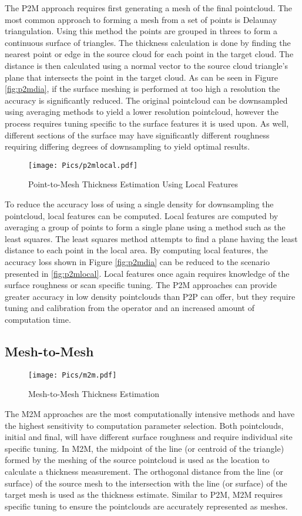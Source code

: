 The P2M approach requires first generating a mesh of the final pointcloud. The most common approach to forming a mesh from a set of points is Delaunay triangulation. Using this method the points are grouped in threes to form a continuous surface of triangles. The thickness calculation is done by finding the nearest point or edge in the source cloud for each point in the target cloud. The distance is then calculated using a normal vector to the source cloud triangle's plane that intersects the point in the target cloud. As can be seen in Figure \ref{fig:p2mdia}, if the surface meshing is performed at too high a resolution the accuracy is significantly reduced. The original pointcloud can be downsampled using averaging methods to yield a lower resolution pointcloud, however the process requires tuning specific to the surface features it is used upon. As well, different sections of the surface may have significantly different roughness requiring differing degrees of downsampling to yield optimal results.\\
\begin{figure}[h!]
    \centering
    \texttt{[image: Pics/p2mlocal.pdf]}
    \caption{Point-to-Mesh Thickness Estimation Using Local Features}
    \label{fig:p2mlocaldia}
\end{figure}
To reduce the accuracy loss of using a single density for downsampling the pointcloud, local features can be computed. Local features are computed by averaging a group of points to form a single plane using a method such as the least squares. The least squares method attempts to find a plane having the least distance to each point in the local area. By computing local features, the accuracy loss shown in Figure \ref{fig:p2mdia} can be reduced to the scenario presented in \ref{fig:p2mlocal}. Local features once again requires knowledge of the surface roughness or scan specific tuning. The P2M approaches can provide greater accuracy in low density pointclouds than P2P can offer, but they require tuning and calibration from the operator and an increased amount of computation time.\\
\subsection{Mesh-to-Mesh}
\begin{figure}[h!]
    \centering
    \texttt{[image: Pics/m2m.pdf]}
    \caption{Mesh-to-Mesh Thickness Estimation}
    \label{fig:m2mdia}
\end{figure}
The M2M approaches are the most computationally intensive methods and have the highest sensitivity to computation parameter selection. Both pointclouds, initial and final, will have different surface roughness and require individual site specific tuning. In M2M, the midpoint of the line (or centroid of the triangle) formed by the meshing of the source pointcloud is used as the location to calculate a thickness measurement. The orthogonal distance from the line (or surface) of the source mesh to the intersection with the line (or surface) of the target mesh is used as the thickness estimate. Similar to P2M, M2M requires specific tuning to ensure the pointclouds are accurately represented as meshes.\\
